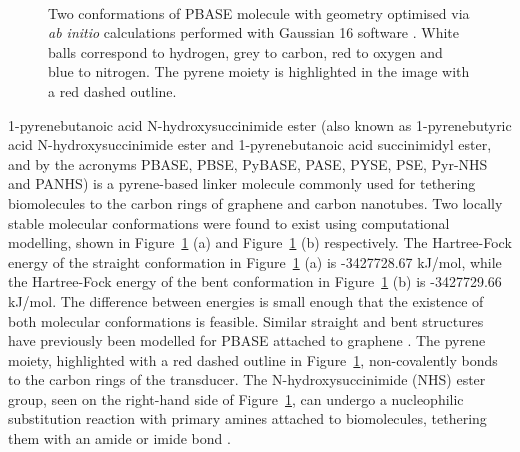 \documentclass[
  a4paper,
]{scrbook}
\begin{document}
\begin{figure}
\begin{minipage}[t]{0.45\linewidth}
{{}

}

\end{minipage}%
%
\begin{minipage}[t]{0.01\linewidth}

{\centering 

~

}

\end{minipage}%

\caption{\label{fig-pbase-structure}Two conformations of PBASE molecule
with geometry optimised via \emph{ab initio} calculations performed with
Gaussian 16 software \autocite{g16}. White balls correspond to hydrogen,
grey to carbon, red to oxygen and blue to nitrogen. The pyrene moiety is
highlighted in the image with a red dashed outline.}

\end{figure}

1-pyrenebutanoic acid N-hydroxysuccinimide ester (also known as
1-pyrenebutyric acid N-hydroxysuccinimide ester and 1-pyrenebutanoic
acid succinimidyl ester, and by the acronyms PBASE, PBSE, PyBASE, PASE,
PYSE, PSE, Pyr-NHS and PANHS) is a pyrene-based linker molecule commonly
used for tethering biomolecules to the carbon rings of graphene and
carbon nanotubes. Two locally stable molecular conformations were found
to exist using computational modelling, shown in
Figure~\ref{fig-pbase-structure} (a) and
Figure~\ref{fig-pbase-structure} (b) respectively. The Hartree-Fock
energy of the straight conformation in Figure~\ref{fig-pbase-structure}
(a) is -3427728.67 kJ/mol, while the Hartree-Fock energy of the bent
conformation in Figure~\ref{fig-pbase-structure} (b) is -3427729.66
kJ/mol. The difference between energies is small enough that the
existence of both molecular conformations is feasible. Similar straight
and bent structures have previously been modelled for PBASE attached to
graphene \autocite{Oishi2022}. The pyrene moiety, highlighted with a red
dashed outline in Figure~\ref{fig-pbase-structure}, non-covalently bonds
to the carbon rings of the transducer. The N-hydroxysuccinimide (NHS)
ester group, seen on the right-hand side of
Figure~\ref{fig-pbase-structure}, can undergo a nucleophilic
substitution reaction with primary amines attached to biomolecules,
tethering them with an amide or imide bond
\autocite{Chen2001,Hermanson2013-16,Hermanson2013-3,Shkodra2021,Mishyn2022}.
\end{document}
